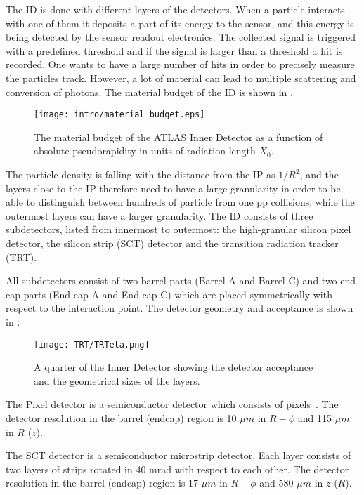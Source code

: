 The ID is done with different layers of the detectors. When a particle interacts with one of them it deposits a part of its energy to the sensor,
and this energy is being detected by the sensor readout electronics. The collected signal is triggered with a predefined threshold and if 
the signal is larger than a threshold a hit is recorded.
One wants to have a large number of hits in order to precisely measure the particles track.  
However, a lot of material can lead to multiple scattering and conversion of photons.
The material  budget of the ID is shown in .

\begin{figure}
\centering
\texttt{[image: intro/material\_budget.eps]}
\caption{ 
The material budget of the ATLAS Inner Detector as a function of absolute pseudorapidity in units of radiation length $X_0$.
}
\label{fig:material_budget}
\end{figure}


The particle density is falling with the distance from the IP as $1/R^2$, 
and the layers close to the IP therefore need to have a large granularity in order to be able to distinguish between
hundreds of particle from one pp collisions, while the outermost layers can have a larger granularity.
The ID consists of three subdetectors, listed from innermost to outermost: the high-granular silicon pixel detector, the silicon strip (SCT) detector and the transition radiation tracker (TRT).

All subdetectors consist of two barrel parts (Barrel A and Barrel C) and two end-cap parts (End-cap A and End-cap C) 
which are placed symmetrically with respect to the interaction point.
The detector geometry and acceptance is shown in .

\begin{figure}
\centering
\texttt{[image: TRT/TRTeta.png]}
\caption{ 
A quarter of the Inner Detector showing the detector acceptance and the geometrical sizes of the layers.
}
\label{fig:ID_eta}
\end{figure}


The Pixel detector is a semiconductor detector which consists of pixels~\cite{Wermes:381263}.
The detector resolution in the barrel (endcap) region is 10 $\mu m$ in $R-\phi$ and 115 $\mu m$ in $R$ ($z$).

The SCT detector is a semiconductor microstrip detector. Each layer consists of two layers of strips rotated in 40 mrad with respect to each other.
The detector resolution in the barrel (endcap) region is 17 $\mu m$ in $R-\phi$ and 580 $\mu m$ in $z$ ($R$).

